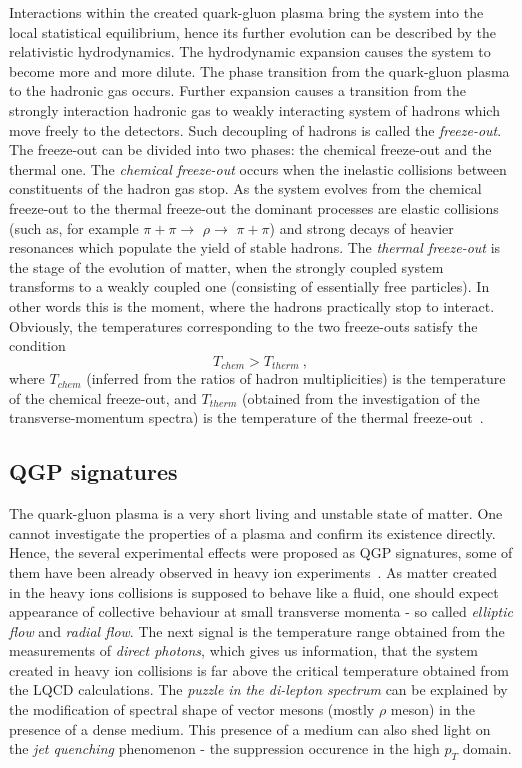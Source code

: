       Interactions within the created quark-gluon plasma bring the system into the local statistical equilibrium, hence its further evolution can be described by the relativistic hydrodynamics.
      The hydrodynamic expansion causes the system to become more and more dilute.
      The phase transition from the quark-gluon plasma to the hadronic gas occurs.
      Further expansion causes a transition from the strongly interaction hadronic gas to weakly interacting system of hadrons which move freely to the detectors.
      Such decoupling of hadrons is called the \textit{freeze-out}.
      The freeze-out can be divided into two phases: the chemical freeze-out and the thermal one.
      The \textit{chemical freeze-out} occurs when the inelastic collisions between constituents of the hadron gas stop.
      As the system evolves from the chemical freeze-out to the thermal freeze-out the dominant processes are elastic collisions (such as, for example $\pi+\pi\to$ $\rho \to$ $\pi+\pi$) and strong decays of heavier resonances which populate the yield of stable hadrons.
      The \textit{thermal freeze-out} is the stage of the evolution of matter, when the strongly coupled system transforms to a weakly coupled one (consisting of essentially free particles).
      In other words this is the moment, where the hadrons practically stop to interact.
      Obviously, the temperatures corresponding to the two freeze-outs satisfy the condition
      \begin{equation}
        T_{chem} > T_{therm}~,
      \end{equation}
      where $T_{chem}$ (inferred from the ratios of hadron multiplicities) is the temperature of the chemical freeze-out, and $T_{therm}$ (obtained from the investigation of the transverse-momentum spectra) is the temperature of the thermal freeze-out~\cite{florkowski}.

    \subsection{QGP signatures}
      The quark-gluon plasma is a very short living and unstable state of matter.
      One cannot investigate the properties of a plasma and confirm its existence directly.
      Hence, the several experimental effects were proposed as QGP signatures, some of them have been already observed in heavy ion experiments~\cite{drkisiel}.
      As matter created in the heavy ions collisions is supposed to behave like a fluid, one should expect appearance of collective behaviour at small transverse momenta - so called \textit{elliptic flow} and \textit{radial flow}.
      The next signal is the temperature range obtained from the measurements of \textit{direct photons}, which gives us information, that the system created in heavy ion collisions is far above the critical temperature obtained from the LQCD calculations.
      The \textit{puzzle in the di-lepton spectrum} can be explained by the modification of spectral shape of vector mesons (mostly $\rho$ meson) in the presence of a dense medium.
      This presence of a medium can also shed light on the \textit{jet quenching} phenomenon - the suppression occurence in the high $p_T$ domain.
